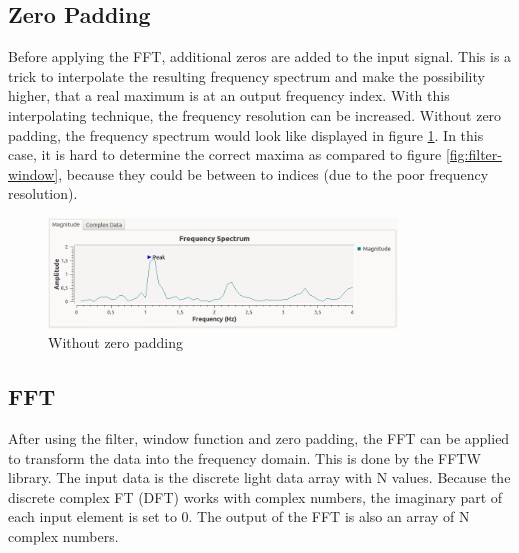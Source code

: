 \documentclass[notitlepage]{scrreprt}
\begin{document}
\subsection{Zero Padding}
\label{subsec:zp}
Before applying the FFT, additional zeros are added to the input signal. This is a trick to interpolate the resulting frequency spectrum and make the possibility higher, that a real maximum is at an output frequency index. With this interpolating technique, the frequency resolution can be increased. Without zero padding, the frequency spectrum would look like displayed in figure \ref{fig:without-zp}. In this case, it is hard to determine the correct maxima as compared to figure \ref{fig:filter-window}, because they could be between to indices (due to the poor frequency resolution).

\begin{figure}[H]
	\centering
	\includegraphics[width=350px]{images/noZeroPaddingAndWithEverythingElse.png}
	\caption{Without zero padding}
	\label{fig:without-zp}
\end{figure}

\subsection{FFT}
After using the filter, window function and zero padding, the FFT can be applied  to transform the data into the frequency domain. This is done by the FFTW library. The input data is the discrete light data array with N values. Because the discrete complex FT (DFT) works with complex numbers, the imaginary part of each input element is set to 0. The output of the FFT is also an array of N complex numbers.
\end{document}
